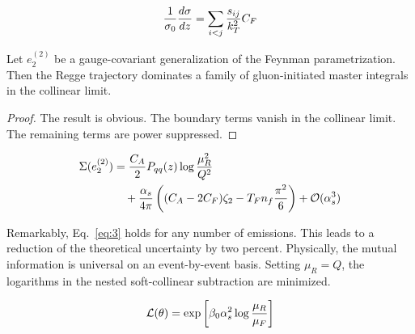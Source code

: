 \begin{equation}
  \frac{1}{\sigma_0} \frac{d\sigma}{dz} = \sum_{i<j} \frac{s_{ij}}{k_T^2} C_F
  \label{eq:2}
\end{equation}

\begin{corollary}[Expressivity]\label{thm:2}
Let $e_2^{(2)}$ be a gauge-covariant generalization of the Feynman
parametrization. Then the Regge trajectory dominates a family of
gluon-initiated master integrals in the collinear limit.
\end{corollary}

\begin{proof}
The result is obvious. The boundary terms vanish in the collinear limit.
The remaining terms are power suppressed.
\end{proof}

\begin{align}
  \Sigma(e_2^{(2)}) &= \frac{C_A}{2} P_{qq}(z) \log\frac{\mu_R^2}{Q^2} \nonumber \\
  &\quad + \frac{\alpha_s}{4\pi} \left( (C_A - 2C_F) \zeta_{2} - T_F n_f \frac{\pi^2}{6} \right) + \mathcal{O}(\alpha_s^3) \label{eq:4}
\end{align}

Remarkably, Eq.~\eqref{eq:3} holds for any number of emissions. This
leads to a reduction of the theoretical uncertainty by two percent.
Physically, the mutual information is universal on an event-by-event
basis. Setting $\mu_R = Q$, the logarithms in the nested soft-collinear
subtraction are minimized.

\begin{equation}
  \mathcal{L}(\theta) = \exp\left[\beta_0 \alpha_s^2 \log\frac{\mu_R}{\mu_F}\right]
  \label{eq:5}
\end{equation}

